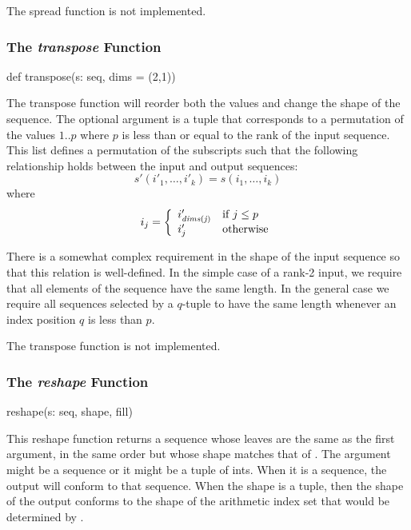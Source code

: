 \begin{status}
The spread function is not implemented.
\end{status}

\subsubsection{The {\em transpose} Function}
\label{The_em_transpose_Function}

\begin{chapel}
def transpose(s: seq, dims = (2,1))
\end{chapel}

The transpose function will reorder both the values and change the
shape of the sequence. The optional  argument is a tuple
that corresponds to a permutation of the values $1..p$ where $p$ is
less than or equal to the rank of the input sequence. This list
defines a permutation of the subscripts such that the following
relationship holds between the input and output sequences:
$$
    s'(i'_1,\ldots,i'_k) = s(i_1,\ldots,i_k)
$$
where
$$
    i_j = \left\{\begin{array}{ll}
                 i'_{\it dims(j)} & \mbox{if $j\le p$}\\
		 i'_j & \mbox{otherwise}
		 \end{array}
          \right.
$$

There is a somewhat complex requirement in the shape of the input
sequence so that this relation is well-defined. In the simple case of
a rank-2 input, we require that all elements of the sequence have the
same length.  In the general case we require all sequences selected by
a $q$-tuple to have the same length whenever an index position $q$ is
less than $p$.

\begin{status}
The transpose function is not implemented.
\end{status}

\subsubsection{The {\em reshape} Function}
\label{The_em_reshape_Function}

\begin{chapel}
reshape(s: seq, shape, fill)
\end{chapel}

This reshape function returns a sequence whose leaves are the same as
the first argument, in the same order but whose shape matches that
of . The  argument might be a sequence or it
might be a tuple of ints. When it is a sequence, the output will
conform to that sequence. When the shape is a tuple, then the shape of
the output conforms to the shape of the arithmetic index set that
would be determined by .


